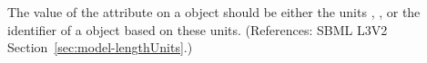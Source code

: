 The value of the attribute  on a \Model object should be
either the units , , or the identifier of a
\UnitDefinition object based on these units.  (References: SBML L3V2
Section~\ref{sec:model-lengthUnits}.)
